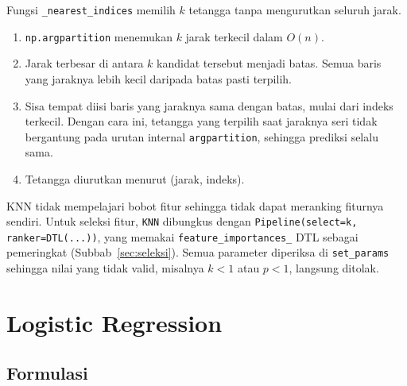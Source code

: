 Fungsi \texttt{\_nearest\_indices} memilih $k$ tetangga tanpa mengurutkan
seluruh jarak.
\begin{enumerate}
	\item \texttt{np.argpartition} menemukan $k$ jarak terkecil dalam $O(n)$.
	\item Jarak terbesar di antara $k$ kandidat tersebut menjadi batas. Semua
	baris yang jaraknya lebih kecil daripada batas pasti terpilih.
	\item Sisa tempat diisi baris yang jaraknya sama dengan batas, mulai dari
	indeks terkecil. Dengan cara ini, tetangga yang terpilih saat jaraknya seri
	tidak bergantung pada urutan internal \texttt{argpartition}, sehingga
	prediksi selalu sama.
	\item Tetangga diurutkan menurut (jarak, indeks).
\end{enumerate}
KNN tidak mempelajari bobot fitur sehingga tidak dapat meranking fiturnya
sendiri. Untuk seleksi fitur, \texttt{KNN} dibungkus dengan
\texttt{Pipeline(select=k, ranker=DTL(...))}, yang memakai
\texttt{feature\_importances\_} DTL sebagai pemeringkat
(Subbab~\ref{sec:seleksi}). Semua parameter diperiksa di \texttt{set\_params}
sehingga nilai yang tidak valid, misalnya $k<1$ atau $p<1$, langsung ditolak.







\section{Logistic Regression}
\label{sec:lr}

\subsection{Formulasi}


